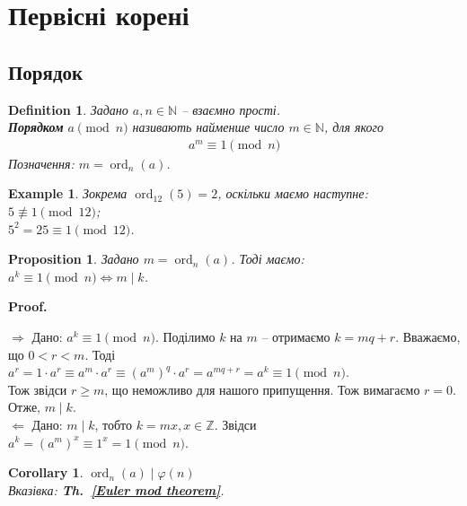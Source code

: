 \documentclass[a4paper, 14pt]{extarticle}
\makeatletter
\theoremstyle{theoremdd}
\theoremstyle{theoremdd}
\newtheorem{definition}[theorem]{Definition}
\theoremstyle{theoremdd}
\theoremstyle{theoremdd}
\newtheorem{example}[theorem]{Example}
\theoremstyle{theoremdd}
\newtheorem{proposition}[theorem]{Proposition}
\theoremstyle{theoremdd}
\theoremstyle{theoremdd}
\theoremstyle{theoremdd}
\newtheorem{corollary}[theorem]{Corollary}
\def\qed{$\blacksquare$}
\def\rightproof{$\boxed{\Rightarrow}$ }
\def\leftproof{$\boxed{\Leftarrow}$ }
\renewenvironment{proof}[1][Proof.\\]{\par
\pushQED{\hfill \qed}%
\normalfont \topsep6\p@\@plus6\p@\relax
\trivlist
\item\relax
{\bfseries
#1\@addpunct{.}}\hspace\labelsep\ignorespaces
}{%
\popQED\endtrivlist\@endpefalse
}
\DeclareMathOperator{\ord}{ord}
\newcommand\thref[1]{\textbf{Th.~\ref{#1}}}
\makeatother
\begin{document}
\section{Первісні корені}

\subsection{Порядок}
\begin{definition}
Задано $a,n \in \mathbb{N}$ -- взаємно прості.\\
\textbf{Порядком} $a \pmod n$ називають найменше число $m \in \mathbb{N}$, для якого
\begin{align*}
a^m \equiv 1 \pmod n
\end{align*}
Позначення: $m = \ord_n(a)$.
\end{definition}

\begin{example}
Зокрема $\ord_{12}(5) = 2$, оскільки маємо наступне:\\
$5 \not \equiv 1 \pmod {12}$;\\
$5^2 = 25 \equiv 1 \pmod {12}$.
\end{example}

\begin{proposition}
Задано $m = \ord_n(a)$. Тоді маємо:\\
$a^k \equiv 1 \pmod n \iff m \mid k$.
\end{proposition}

\begin{proof}
\rightproof Дано: $a^k \equiv 1 \pmod n$. Поділимо $k$ на $m$ -- отримаємо $k = mq +r$. Вважаємо, що $0 < r < m$. Тоді\\
$a^r = 1 \cdot a^r \equiv a^m \cdot a^r \equiv (a^m)^q \cdot a^r = a^{mq+r} = a^k \equiv 1 \pmod n$.\\
Тож звідси $r \geq m$, що неможливо для нашого припущення. Тож вимагаємо $r = 0$. Отже, $m \mid k$.
\bigskip \\
\leftproof Дано: $m \mid k$, тобто $k = mx, x \in \mathbb{Z}$. Звідси\\
$a^k = (a^m)^x \equiv 1^x = 1 \pmod n$.
\end{proof}

\begin{corollary}
$\ord_n(a) \mid \varphi(n)$\\
\textit{Вказівка:} \thref{Euler mod theorem}.
\end{corollary}

\iffalse
\begin{example}
Доведемо, що прості множники чисел Ферма $F_n = 2^{2^n} + 1$ мають форму $x 2^{n+1} +1$ для деякого $x \in \mathbb{N}$.\\
Нехай $p|F_n$, тобто $F_n \equiv 0 \pmod p$, що теж саме, що $2^{2^n} \equiv -1 \pmod p$.\\
Звідси $(2^{2^n})^2 = 2^{2^{n+1}} \equiv 1 \pmod p$. Отже, за твердженням, $\ord_p(2) | 2^{n+1}$. Доведемо, що $\ord_p 2 = 2^{n+1}$.\\
!Припустимо, що $\ord_p 2 \neq 2^{n+1}$. Тоді звідси $\ord_p 2 | 2^n$.
\end{example}
\fi
\end{document}
